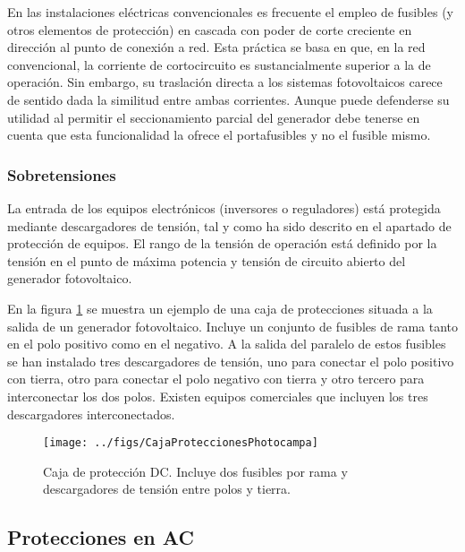En las instalaciones eléctricas convencionales es frecuente el empleo
de fusibles (y otros elementos de protección) en cascada con poder
de corte creciente en dirección al punto de conexión a red. Esta práctica
se basa en que, en la red convencional, la corriente de cortocircuito
es sustancialmente superior a la de operación. Sin embargo, su traslación
directa a los sistemas fotovoltaicos carece de sentido dada la similitud
entre ambas corrientes. Aunque puede defenderse su utilidad al permitir
el seccionamiento parcial del generador debe tenerse en cuenta que
esta funcionalidad la ofrece el portafusibles y no el fusible mismo. 


\subsubsection{Sobretensiones}

La entrada de los equipos electrónicos (inversores o reguladores)
está protegida mediante descargadores de tensión, tal y como ha sido descrito en
el apartado de protección de equipos. El rango de la tensión de operación
está definido por la tensión en el punto de máxima potencia y tensión
de circuito abierto del generador fotovoltaico.

En la figura \ref{fig:Caja-de-protecci=0000F3n} se muestra un ejemplo
de una caja de protecciones situada a la salida de un generador fotovoltaico.
Incluye un conjunto de fusibles de rama tanto en el polo positivo
como en el negativo. A la salida del paralelo de estos fusibles se
han instalado tres descargadores de tensión, uno para conectar el polo positivo
con tierra, otro para conectar el polo negativo con tierra y otro
tercero para interconectar los dos polos. Existen equipos comerciales
que incluyen los tres descargadores interconectados.

%
\begin{figure}
\begin{centering}
\texttt{[image: ../figs/CajaProteccionesPhotocampa]}
\end{centering}

\caption[Caja de protección DC]{Caja de protección DC. Incluye dos
  fusibles por rama y descargadores de tensión entre polos y
  tierra.\label{fig:Caja-de-protecci=0000F3n}}

\end{figure}



\subsection{Protecciones en AC}


